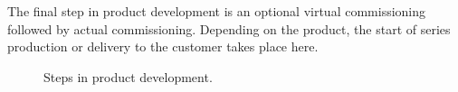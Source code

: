     The final step in product development is an optional virtual commissioning followed by actual commissioning. Depending on the product, the start of series production or delivery to the customer takes place here. \\
    
	\begin{figure}[htp]
	    \footnotesize
		\centering
		\begin{adjustbox}{width = \textwidth}
        \end{adjustbox}
		\caption{Steps in product development.}
		\label{fig:StepsProductDevelopment}
	\end{figure}
	
